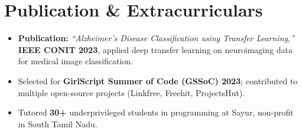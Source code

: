 \documentclass[letterpaper,10pt]{article}
\begin{document}
\section{Publication \& Extracurriculars}
\begin{itemize}[leftmargin=0.18in, itemsep=0pt, topsep=1pt]
  \item\small \textbf{Publication:} \textit{``Alzheimer's Disease Classification using Transfer Learning,''} \textbf{IEEE CONIT 2023}, applied deep transfer learning on neuroimaging data for medical image classification.
  \item\small Selected for \textbf{GirlScript Summer of Code (GSSoC) 2023}; contributed to multiple open-source projects (Linkfree, Freehit, ProjectsHut).
  \item\small Tutored \textbf{30+} underprivileged students in programming at Sayur, non-profit in South Tamil Nadu.
\end{itemize}
\vspace{-6pt}
\end{document}
